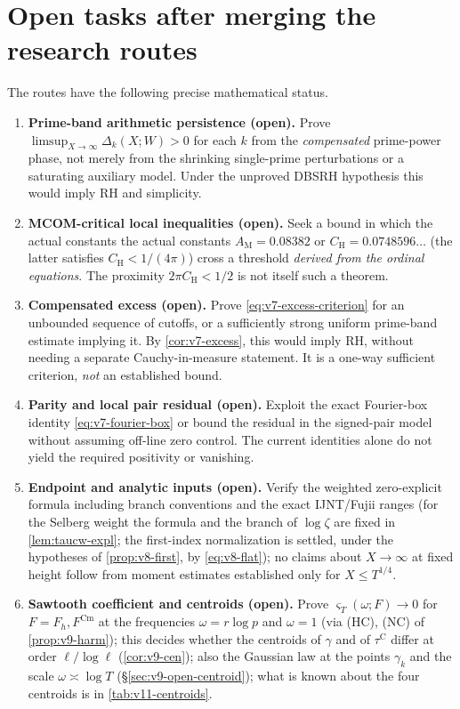\documentclass[11pt,a4paper]{article}
\numberwithin{equation}{section}
\theoremstyle{definition}
\theoremstyle{remark}
\newcommand{\Cm}{\mathrm{Cm}}
\begin{document}
\section{Open tasks after merging the research routes}\label{sec:v7-open}
The routes have the following precise mathematical status.
\begin{enumerate}[label=(\arabic*),leftmargin=*]
\item \textbf{Prime-band arithmetic persistence (open).}
 Prove $\limsup_{X\to\infty}\Delta_k(X;W)>0$ for each
 $k$ from the \emph{compensated} prime-power phase, not merely
 from the shrinking single-prime perturbations or a saturating
 auxiliary model. Under the unproved DBSRH hypothesis this
 would imply RH and simplicity.
\item \textbf{MCOM-critical local inequalities (open).}
 Seek a bound in which the actual constants
 the actual constants $A_{\mathrm M}=0.08382$ or $C_{\mathrm H}=0.0748596\ldots$ (the latter satisfies $C_{\mathrm H}<1/(4\pi)$) cross
 a threshold \emph{derived from the ordinal equations}. The
 proximity $2\pi C_{\mathrm H}<1/2$ is not itself such a theorem.
\item \textbf{Compensated excess (open).}
 Prove \eqref{eq:v7-excess-criterion} for an unbounded
 sequence of cutoffs, or a sufficiently strong uniform
 prime-band estimate implying it. By
 \cref{cor:v7-excess}, this would imply RH, without needing
 a separate Cauchy-in-measure statement. It is a one-way
 sufficient criterion, \emph{not} an established bound.
\item \textbf{Parity and local pair residual (open).}
 Exploit the exact Fourier-box identity
 \eqref{eq:v7-fourier-box} or bound the residual in the
 signed-pair model without assuming off-line zero control.
 The current identities alone do not yield the required
 positivity or vanishing.
\item \textbf{Endpoint and analytic inputs (open).}
 Verify the weighted zero-explicit formula including
 branch conventions and the exact IJNT/Fujii ranges (for the Selberg
 weight the formula and the branch of $\log\zeta$ are fixed in
 \cref{lem:taucw-expl}; the
 first-index normalization is settled, under the hypotheses of
 \cref{prop:v8-first}, by \eqref{eq:v8-flat}); no claims about
 $X\to\infty$ at fixed height follow from moment estimates
 established only for $X\le T^{1/4}$.
\item \textbf{Sawtooth coefficient and centroids (open).}
 Prove $\varsigma_T(\omega;F)\to0$ for $F=F_h,F^{\Cm}$ at the
 frequencies $\omega=r\log p$ and $\omega=1$ (via (HC), (NC) of
 \cref{prop:v9-harm}); this decides
 whether the centroids of $\gamma$ and of $\tau^{\mathrm C}$ differ at
 order $\ell/\log\ell$ (\cref{cor:v9-cen}); also the Gaussian law at the
 points $\gamma_k$ and the scale $\omega\asymp\log T$
 (\S\ref{sec:v9-open-centroid}); what is known about the four centroids is in \cref{tab:v11-centroids}.
\end{enumerate}
\end{document}
